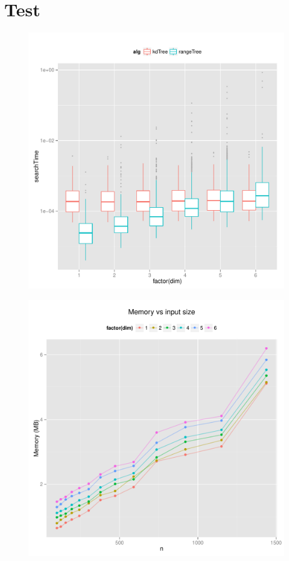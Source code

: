 \documentclass{article}
\begin{document}
\section{Test}
\begin{figure}[H]
    \centering
    \includegraphics[width=\textwidth]{../src/R/plots/boxplot.pdf}
\end{figure}
\begin{figure}[H]
    \centering
    \includegraphics[width=\textwidth]{../src/R/plots/kdmem.pdf}
\end{figure}
\end{document}
